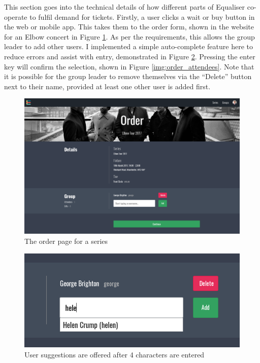 \documentclass[12pt,a4paper]{bhamdissertation}
\begin{document}

This section goes into the technical details of how different parts of Equaliser co-operate to fulfil demand for tickets. Firstly, a user clicks a wait or buy button in the web or mobile app. This takes them to the order form, shown in the website for an Elbow concert in Figure \ref{img:order}. As per the requirements, this allows the group leader to add other users. I implemented a simple auto-complete feature here to reduce errors and assist with entry, demonstrated in Figure \ref{img:order_autocomplete}. Pressing the enter key will confirm the selection, shown in Figure \ref{img:order_attendees}. Note that it is possible for the group leader to remove themselves via the ``Delete'' button next to their name, provided at least one other user is added first.

\begin{figure}[!htbp]
    \centering
    \includegraphics[width=1\linewidth]{img/order.png}
    \caption{The order page for a series}
    \label{img:order}
\end{figure}

\begin{figure}[!htbp]
    \centering
    \includegraphics[width=1\linewidth]{img/order_autocomplete.png}
    \caption{User suggestions are offered after 4 characters are entered}
    \label{img:order_autocomplete}
\end{figure}
\end{document}
